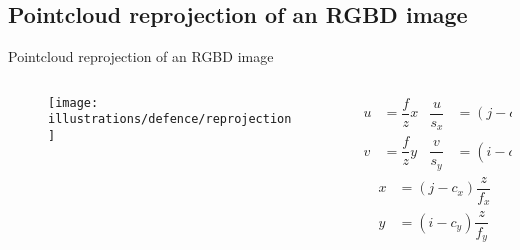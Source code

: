 \documentclass[aspectratio=169,hyperref={pdfpagelabels=false}]{beamer}
\begin{document}
    \subsection{Pointcloud reprojection of an RGBD image}
    \begin{frame}{Pointcloud reprojection of an RGBD image}
        \begin{columns}%
            \begin{column}{.5\textwidth}
                \begin{figure}
                    \centering
                    \texttt{[image: illustrations/defence/reprojection]}
                \end{figure}
            \end{column}%
            \begin{column}{.5\textwidth}
                \pause
                \begin{align}
                    u &= \dfrac{f}{z} x & \dfrac{u}{s_x} &= (j - c_x) \label{eq:pcd_rgbd:u} \\
                    v &= \dfrac{f}{z} y & \dfrac{v}{s_y} &= (i - c_y) \label{eq:pcd_rgbd:v}
                \end{align}
                \pause
                \begin{align}
                    x &= (j - c_x) \dfrac{z}{f_x} \label{eq:pcd_rgbd:x} \\
                    y &= (i - c_y) \dfrac{z}{f_y} \label{eq:pcd_rgbd:y}
                \end{align}
            \end{column}%
        \end{columns}
    \end{frame}
\end{document}
